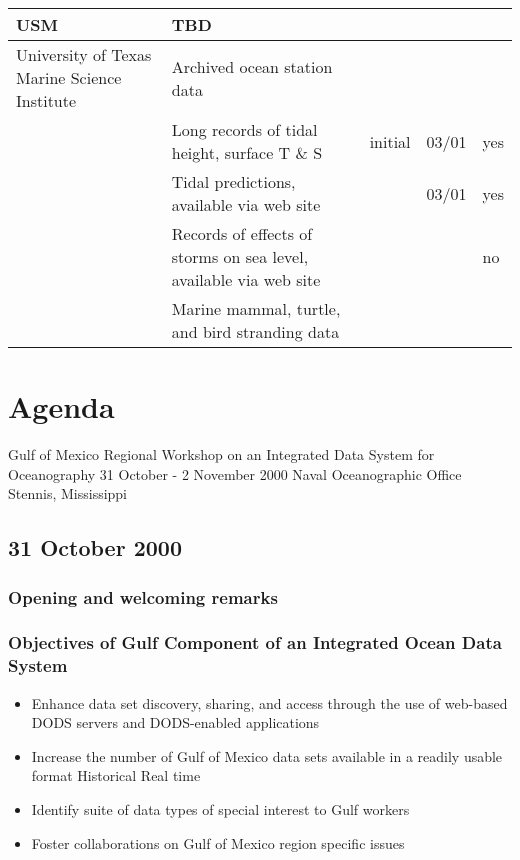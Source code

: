 \begin{longtable}{|p{0.75in}|p{2.75in}|p{0.5in}|p{0.5in}|p{0.5in}|}
USM &          TBD & & & \\ \hline

University of Texas Marine Science Institute &
Archived ocean station data & & & \\
&     Long records of tidal height,  
         surface T \& S & initial   &   03/01  &   yes \\
&      Tidal predictions, available
      via web site &   &                03/01  &   yes \\
&     Records of effects of storms
               on sea level, available via 
               web site  & & &  no  \\
&             Marine mammal, turtle, and bird 
               stranding data & & & \\ \hline

             \end{longtable}


\section{Agenda}
\label{I,agenda}

\begin{center}
  Gulf of Mexico Regional Workshop on an Integrated Data System for Oceanography
31 October - 2 November 2000
Naval Oceanographic Office
Stennis, Mississippi
\end{center}

\subsection{31 October 2000}

\subsubsection{Opening and welcoming remarks}

\subsubsection{Objectives of Gulf Component of an Integrated Ocean Data System}

\begin{itemize}
\item    Enhance data set discovery, sharing, and access through the use of web-based DODS servers 
and DODS-enabled applications
\item     Increase the number of Gulf of Mexico data sets available in a readily usable format
                Historical
                Real time
\item     Identify suite of data types of special interest to Gulf workers
\item     Foster collaborations on Gulf of Mexico region specific issues
\end{itemize}

